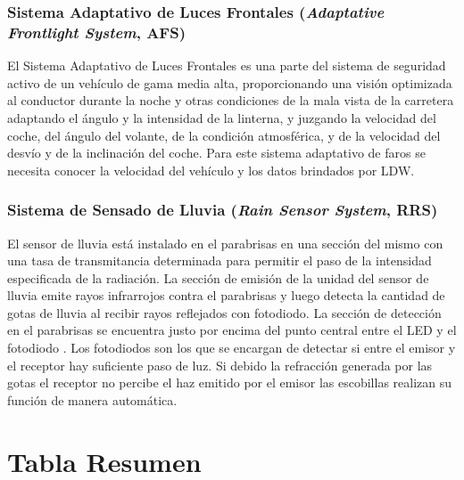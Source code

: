 \subsubsection{Sistema Adaptativo de Luces Frontales  {\footnotesize(\textit{Adaptative Frontlight System}, AFS)} }

El Sistema Adaptativo de Luces Frontales es una parte del sistema de seguridad activo de un vehículo de gama media alta, proporcionando una visión optimizada al conductor durante la noche y otras condiciones de la mala vista de la carretera adaptando el ángulo y la intensidad de la linterna, y juzgando la velocidad del coche, del ángulo del volante, de la condición atmosférica, y de la velocidad del desvío y de la inclinación del coche\cite{INSTRUMENTS2013}. Para este sistema adaptativo de faros se necesita conocer la velocidad del vehículo y los datos brindados por LDW.

\newpage

\subsubsection{Sistema de Sensado de Lluvia {\footnotesize(\textit{Rain Sensor System}, RRS)}}

El sensor de lluvia está instalado en el parabrisas en una sección del mismo con una tasa de transmitancia determinada para permitir el paso de la intensidad especificada de la radiación. La sección de emisión de la unidad del sensor de lluvia emite rayos infrarrojos contra el parabrisas y luego detecta la cantidad de gotas de lluvia al recibir rayos reflejados con fotodiodo. La sección de detección en el parabrisas se encuentra justo por encima del punto central entre el LED y el fotodiodo \cite{Wiper2004}. Los fotodiodos son los que se encargan de detectar si entre el emisor y el receptor hay suficiente paso de luz. Si debido la refracción generada por las gotas el receptor no percibe el haz emitido por el emisor las escobillas realizan su función de manera automática. 

\newpage

\section{Tabla Resumen}


